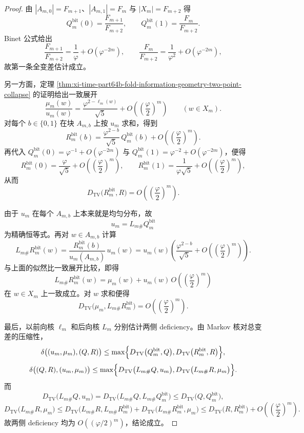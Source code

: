\begin{proof}
由 \(|A_{m,0}|=F_{m+1}\)、\(|A_{m,1}|=F_m\) 与 \(|X_m|=F_{m+2}\) 得
\[
Q_m^{\mathrm{bit}}(0)=\frac{F_{m+1}}{F_{m+2}},
\qquad
Q_m^{\mathrm{bit}}(1)=\frac{F_m}{F_{m+2}}.
\]
Binet 公式给出
\[
\frac{F_{m+1}}{F_{m+2}}=\frac1\varphi+O(\varphi^{-2m}),
\qquad
\frac{F_m}{F_{m+2}}=\frac1{\varphi^2}+O(\varphi^{-2m}),
\]
故第一条全变差估计成立。

另一方面，定理 \ref{thm:xi-time-part64b-fold-information-geometry-two-point-collapse} 的证明给出一致展开
\[
\frac{\mu_m(w)}{u_m(w)}
=
\frac{\varphi^{2-\ell_m(w)}}{\sqrt5}
+
O\!\left(\left(\frac{\varphi}{2}\right)^m\right)
\qquad (w\in X_m).
\]
对每个 \(b\in\{0,1\}\) 在块 \(A_{m,b}\) 上按 \(u_m\) 求和，得到
\[
R_m^{\mathrm{bit}}(b)
=
\frac{\varphi^{2-b}}{\sqrt5}\,Q_m^{\mathrm{bit}}(b)
+
O\!\left(\left(\frac{\varphi}{2}\right)^m\right).
\]
再代入 \(Q_m^{\mathrm{bit}}(0)=\varphi^{-1}+O(\varphi^{-2m})\) 与
\(Q_m^{\mathrm{bit}}(1)=\varphi^{-2}+O(\varphi^{-2m})\)，便得
\[
R_m^{\mathrm{bit}}(0)=\frac{\varphi}{\sqrt5}
+
O\!\left(\left(\frac{\varphi}{2}\right)^m\right),
\qquad
R_m^{\mathrm{bit}}(1)=\frac{1}{\varphi\sqrt5}
+
O\!\left(\left(\frac{\varphi}{2}\right)^m\right),
\]
从而
\[
D_{\mathrm{TV}}\bigl(R_m^{\mathrm{bit}},R\bigr)
=
O\!\left(\left(\frac{\varphi}{2}\right)^m\right).
\]

由于 \(u_m\) 在每个 \(A_{m,b}\) 上本来就是均匀分布，故
\[
u_m=L_{m\#}Q_m^{\mathrm{bit}}
\]
为精确恒等式。再对 \(w\in A_{m,b}\) 计算
\[
L_{m\#}R_m^{\mathrm{bit}}(w)
=
\frac{R_m^{\mathrm{bit}}(b)}{u_m(A_{m,b})}\,u_m(w)
=
u_m(w)\left(
\frac{\varphi^{2-b}}{\sqrt5}
+
O\!\left(\left(\frac{\varphi}{2}\right)^m\right)
\right).
\]
与上面的似然比一致展开比较，即得
\[
L_{m\#}R_m^{\mathrm{bit}}(w)
=
\mu_m(w)
+
u_m(w)\,O\!\left(\left(\frac{\varphi}{2}\right)^m\right)
\]
在 \(w\in X_m\) 上一致成立。对 \(w\) 求和便得
\[
D_{\mathrm{TV}}\bigl(\mu_m,L_{m\#}R_m^{\mathrm{bit}}\bigr)
=
O\!\left(\left(\frac{\varphi}{2}\right)^m\right).
\]

最后，以前向核 \(\ell_m\) 和后向核 \(L_m\) 分别估计两侧 deficiency。由 Markov 核对总变差的压缩性，
\[
\delta\bigl((u_m,\mu_m),(Q,R)\bigr)
\le
\max\Bigl\{
D_{\mathrm{TV}}\bigl(Q_m^{\mathrm{bit}},Q\bigr),
D_{\mathrm{TV}}\bigl(R_m^{\mathrm{bit}},R\bigr)
\Bigr\},
\]
\[
\delta\bigl((Q,R),(u_m,\mu_m)\bigr)
\le
\max\Bigl\{
D_{\mathrm{TV}}\bigl(L_{m\#}Q,u_m\bigr),
D_{\mathrm{TV}}\bigl(L_{m\#}R,\mu_m\bigr)
\Bigr\}.
\]
而
\[
D_{\mathrm{TV}}\bigl(L_{m\#}Q,u_m\bigr)
=
D_{\mathrm{TV}}\bigl(L_{m\#}Q,L_{m\#}Q_m^{\mathrm{bit}}\bigr)
\le
D_{\mathrm{TV}}\bigl(Q,Q_m^{\mathrm{bit}}\bigr),
\]
\[
D_{\mathrm{TV}}\bigl(L_{m\#}R,\mu_m\bigr)
\le
D_{\mathrm{TV}}\bigl(L_{m\#}R,L_{m\#}R_m^{\mathrm{bit}}\bigr)
+
D_{\mathrm{TV}}\bigl(L_{m\#}R_m^{\mathrm{bit}},\mu_m\bigr)
\le
D_{\mathrm{TV}}\bigl(R,R_m^{\mathrm{bit}}\bigr)
+
O\!\left(\left(\frac{\varphi}{2}\right)^m\right).
\]
故两侧 deficiency 均为 \(O((\varphi/2)^m)\)，结论成立。
\end{proof}

